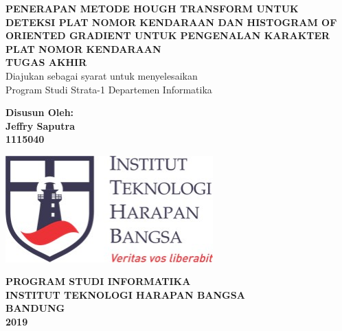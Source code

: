 \begin{titlepage}
\begin{center}
	\onehalfspacing
	{\large \bfseries PENERAPAN METODE HOUGH TRANSFORM UNTUK DETEKSI PLAT NOMOR KENDARAAN DAN HISTOGRAM OF ORIENTED GRADIENT UNTUK PENGENALAN KARAKTER PLAT NOMOR KENDARAAN\\
	\vspace{1.5cm}
	 \large TUGAS AKHIR}\\
           Diajukan sebagai syarat untuk menyelesaikan\\ Program Studi Strata-1 Departemen Informatika

	\vspace{1.5cm}
          {\bfseries Disusun Oleh: \\
           Jeffry Saputra \\
	1115040}
	
	\vspace{1.5cm}
	\includegraphics[width=8cm]{images/ithb.jpg}
	
	
	\vspace{3.5cm}
	
{\large \bfseries PROGRAM STUDI INFORMATIKA \\
INSTITUT TEKNOLOGI HARAPAN BANGSA \\
BANDUNG\\
2019}

	
\end{center}

\end{titlepage}

\newpage